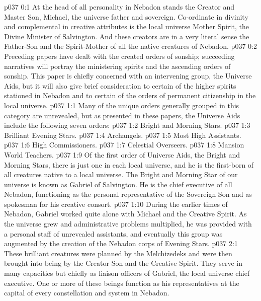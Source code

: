 \author{Brilliant Evening Star}
\vs p037 0:1 At the head of all personality in Nebadon stands the Creator and Master Son, Michael, the universe father and sovereign. Co\hyp{}ordinate in divinity and complemental in creative attributes is the local universe Mother Spirit, the Divine Minister of Salvington. And these creators are in a very literal sense the Father\hyp{}Son and the Spirit\hyp{}Mother of all the native creatures of Nebadon.
\vs p037 0:2 Preceding papers have dealt with the created orders of sonship; succeeding narratives will portray the ministering spirits and the ascending orders of sonship. This paper is chiefly concerned with an intervening group, the Universe Aids, but it will also give brief consideration to certain of the higher spirits stationed in Nebadon and to certain of the orders of permanent citizenship in the local universe.\plusone
{}
\vs p037 1:1 Many of the unique orders generally grouped in this category are unrevealed, but as presented in these papers, the Universe Aids include the following seven orders:
\pc \vs p037 1:2 \bibnobreakspace Bright and Morning Stars.
\vs p037 1:3 \bibnobreakspace Brilliant Evening Stars.
\vs p037 1:4 \bibnobreakspace Archangels.
\vs p037 1:5 \bibnobreakspace Most High Assistants.
\vs p037 1:6 \bibnobreakspace High Commissioners.
\vs p037 1:7 \bibnobreakspace Celestial Overseers.
\vs p037 1:8 \bibnobreakspace Mansion World Teachers.
\pc \vs p037 1:9 Of the first order of Universe Aids, the Bright and Morning Stars, there is just one in each local universe, and he is the first\hyp{}born of all creatures native to a local universe. The Bright and Morning Star of our universe is known as Gabriel of Salvington. He is the chief executive of all Nebadon, functioning as the personal representative of the Sovereign Son and as spokesman for his creative consort.
\vs p037 1:10 During the earlier times of Nebadon, Gabriel worked quite alone with Michael and the Creative Spirit. As the universe grew and administrative problems multiplied, he was provided with a personal staff of unrevealed assistants, and eventually this group was augmented by the creation of the Nebadon corps of Evening Stars.\plusone
{}
\vs p037 2:1 These brilliant creatures were planned by the Melchizedeks and were then brought into being by the Creator Son and the Creative Spirit. They serve in many capacities but chiefly as liaison officers of Gabriel, the local universe chief executive. One or more of these beings function as his representatives at the capital of every constellation and system in Nebadon.
